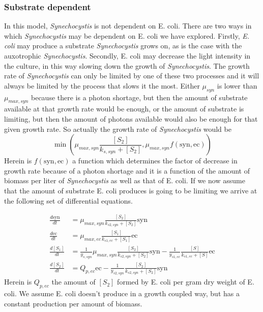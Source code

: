 \documentclass[10pt]{report}
\begin{document}
\subsubsection{Substrate dependent}
In this model, \textit{Synechocystis} is not dependent on E. coli. There are two ways in which \textit{Synechocystis} may be dependent on E. coli we have explored.
Firstly, \textit{E. coli} may produce a substrate \textit{Synechocystis} grows on, as is the case with the auxotrophic \textit{Synechocystis}. Secondly, E. coli may decrease the light intensity in the culture, in this way slowing down the growth of \textit{Synechocystis}. The growth rate of \textit{Synechocystis} can only be limited by one of these two processes and it will always be limited by the process that slows it the most. Either $\mu_{syn}$ is lower than $\mu_{max,syn}$ because there is a photon shortage, but then the amount of substrate available at that growth rate would be enough, or the amount of substrate is limiting, but then the amount of photons available would also be enough for that given growth rate. So actually the growth rate of \textit{Synechocystis} would be 
\begin{equation}\label{eq:min}
 \min(\mu_{max,syn}\frac{[S_{2}]}{k_{s,syn}+[S_2]}, \mu_{max,syn}f(\text{syn},\text{ec}))
\end{equation}
Herein is $f(\text{syn},\text{ec})$ a function which determines the factor of decrease in growth rate because of a photon shortage and it is a function of the amount of biomass per liter of \textit{Synechocystis} as well as that of E. coli.
If we now assume that the amount of substrate E. coli produces is going to be limiting we arrive at the following set of differential equations.

\begin{align} \label{eq:sd}
 \frac{d\text{syn}}{dt} &= \mu_{max,syn} \frac{[S_2]}{k_{s2,syn}+[S_2]} \text{syn} \\
 \frac{d\text{ec}}{dt} &= \mu_{max,ec} \frac{[S_1]}{k_{s1,ec}+[S_1]} \text{ec} \\
 \frac{d[S_1]}{dt} &= \frac{1}{y_{s,syn}} \mu_{max,syn} \frac{[S_2]}{k_{s2,syn}+[S_2]} \text{syn} - \frac{1}{y_{s1,ec}} \frac{[S]}{k_{s1,ec}+[S]} \text{ec} \\
 \frac{d[S_2]}{dt} &=  Q_{p,ec} \text{ec} - \frac{1}{y_{s2,syn}} \frac{[S_2]}{k_{s2,syn}+[S_2]} \text{syn}
\end{align}
Herein is  $Q_{p,ec}$ the amount of $[S_2]$ formed by E. coli per gram dry weight of E. coli. We assume E. coli doesn't produce in a growth coupled way, but has a constant production per amount of biomass.
\end{document}
